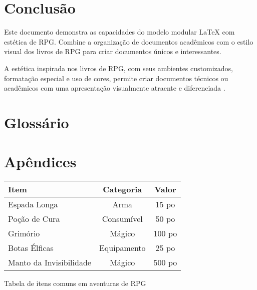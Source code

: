 
\cleardoublepage
\chapter*{Conclusão}

Este documento demonstra as capacidades do modelo modular LaTeX com estética de RPG. Combine a organização de documentos acadêmicos com o estilo visual dos livros de RPG para criar documentos únicos e interessantes.

A estética inspirada nos livros de RPG, com seus ambientes customizados, formatação especial e uso de cores, permite criar documentos técnicos ou acadêmicos com uma apresentação visualmente atraente e diferenciada \cite{rpglayout}.

\cleardoublepage
\chapter*{Glossário}






\printglossaries

\cleardoublepage
\chapter*{Apêndices}

\begin{rpgtable}
\begin{tabular}{lcc}
\toprule
\textbf{Item} & \textbf{Categoria} & \textbf{Valor} \\
\midrule
Espada Longa & Arma & 15 po \\
Poção de Cura & Consumível & 50 po \\
Grimório & Mágico & 100 po \\
Botas Élficas & Equipamento & 25 po \\
Manto da Invisibilidade & Mágico & 500 po \\
\bottomrule
\end{tabular}
\caption{Tabela de itens comuns em aventuras de RPG}
\label{tab:itens}
\end{rpgtable}

